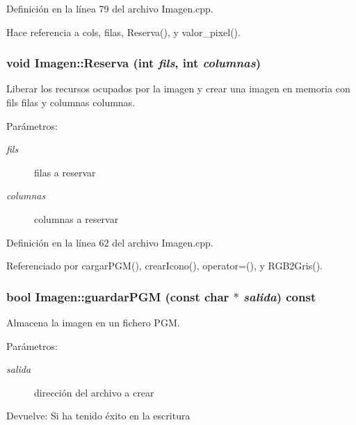 Definición en la línea 79 del archivo Imagen.cpp.

Hace referencia a cols, filas, Reserva(), y valor\_\-pixel().\hypertarget{classImagen_726f1bfb93e599bd4ae7d71f7cd1705a}{
\subsubsection[Reserva]{\setlength{\rightskip}{0pt plus 5cm}void Imagen::Reserva (int {\em fils}, \/  int {\em columnas})}}
\label{classImagen_726f1bfb93e599bd4ae7d71f7cd1705a}


Liberar los recursos ocupados por la imagen y crear una imagen en memoria con fils filas y columnas columnas. 

\begin{Desc}
\item[Parámetros:]
\begin{description}
\item[{\em fils}]filas a reservar \item[{\em columnas}]columnas a reservar \end{description}
\end{Desc}


Definición en la línea 62 del archivo Imagen.cpp.

Referenciado por cargarPGM(), crearIcono(), operator=(), y RGB2Gris().\hypertarget{classImagen_a3a61f0842e0dc3d0309c42d229478b7}{
\subsubsection[guardarPGM]{\setlength{\rightskip}{0pt plus 5cm}bool Imagen::guardarPGM (const char $\ast$ {\em salida}) const}}
\label{classImagen_a3a61f0842e0dc3d0309c42d229478b7}


Almacena la imagen en un fichero PGM. 

\begin{Desc}
\item[Parámetros:]
\begin{description}
\item[{\em salida}]dirección del archivo a crear \end{description}
\end{Desc}
\begin{Desc}
\item[Devuelve:]Si ha tenido éxito en la escritura \end{Desc}


